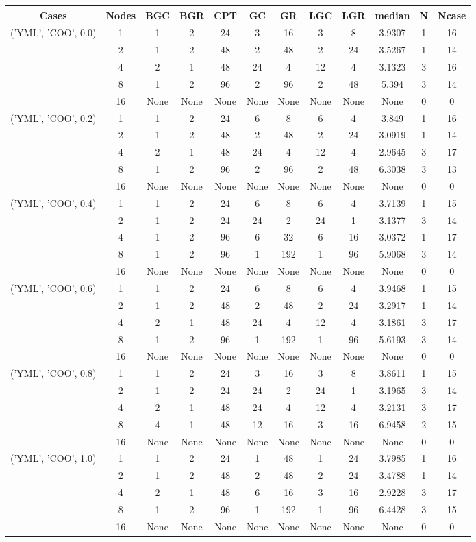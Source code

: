 \begin{tabular}{cccccccccccc}
\hline
Cases & Nodes& BGC& BGR& CPT& GC& GR& LGC& LGR& median & N & Ncase \\
\hline
\multirow{5}{*}{('YML', 'COO', 0.0)}& 1& 1& 2& 24& 3& 16& 3& 8& 3.9307& 1& 16\\
& 2& 1& 2& 48& 2& 48& 2& 24& 3.5267& 1& 14\\
& 4& 2& 1& 48& 24& 4& 12& 4& 3.1323& 3& 16\\
& 8& 1& 2& 96& 2& 96& 2& 48& 5.394& 3& 14\\
& 16& None& None& None& None& None& None& None& None& 0& 0\\
\hline
\multirow{5}{*}{('YML', 'COO', 0.2)}& 1& 1& 2& 24& 6& 8& 6& 4& 3.849& 1& 16\\
& 2& 1& 2& 48& 2& 48& 2& 24& 3.0919& 1& 14\\
& 4& 2& 1& 48& 24& 4& 12& 4& 2.9645& 3& 17\\
& 8& 1& 2& 96& 2& 96& 2& 48& 6.3038& 3& 13\\
& 16& None& None& None& None& None& None& None& None& 0& 0\\
\hline
\multirow{5}{*}{('YML', 'COO', 0.4)}& 1& 1& 2& 24& 6& 8& 6& 4& 3.7139& 1& 15\\
& 2& 1& 2& 24& 24& 2& 24& 1& 3.1377& 3& 14\\
& 4& 1& 2& 96& 6& 32& 6& 16& 3.0372& 1& 17\\
& 8& 1& 2& 96& 1& 192& 1& 96& 5.9068& 3& 14\\
& 16& None& None& None& None& None& None& None& None& 0& 0\\
\hline
\multirow{5}{*}{('YML', 'COO', 0.6)}& 1& 1& 2& 24& 6& 8& 6& 4& 3.9468& 1& 15\\
& 2& 1& 2& 48& 2& 48& 2& 24& 3.2917& 1& 14\\
& 4& 2& 1& 48& 24& 4& 12& 4& 3.1861& 3& 17\\
& 8& 1& 2& 96& 1& 192& 1& 96& 5.6193& 3& 14\\
& 16& None& None& None& None& None& None& None& None& 0& 0\\
\hline
\multirow{5}{*}{('YML', 'COO', 0.8)}& 1& 1& 2& 24& 3& 16& 3& 8& 3.8611& 1& 15\\
& 2& 1& 2& 24& 24& 2& 24& 1& 3.1965& 3& 14\\
& 4& 2& 1& 48& 24& 4& 12& 4& 3.2131& 3& 17\\
& 8& 4& 1& 48& 12& 16& 3& 16& 6.9458& 2& 15\\
& 16& None& None& None& None& None& None& None& None& 0& 0\\
\hline
\multirow{5}{*}{('YML', 'COO', 1.0)}& 1& 1& 2& 24& 1& 48& 1& 24& 3.7985& 1& 16\\
& 2& 1& 2& 48& 2& 48& 2& 24& 3.4788& 1& 14\\
& 4& 2& 1& 48& 6& 16& 3& 16& 2.9228& 3& 17\\
& 8& 1& 2& 96& 1& 192& 1& 96& 6.4428& 3& 15\\
& 16& None& None& None& None& None& None& None& None& 0& 0\\
\hline
\end{tabular}


